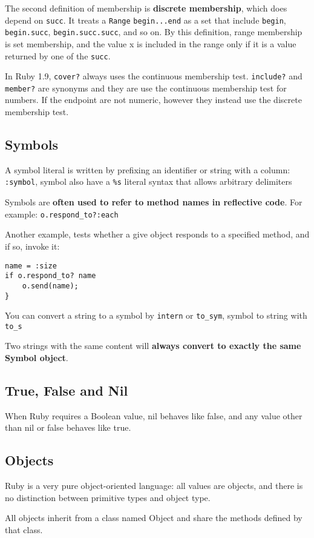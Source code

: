 \documentclass[11pt, a4paper]{book}
\begin{document}
The second definition of membership is \textbf{discrete membership}, which does
depend on \verb|succ|. It treats a \verb|Range| \verb|begin...end| as a set that
include \verb|begin|, \verb|begin.succ|, \verb|begin.succ.succ|, and so on. By
this definition, range membership is set membership, and the value x is included
in the range only if it is a value returned by one of the \verb|succ|.

In Ruby 1.9, \verb|cover?| always uses the continuous membership test.
\verb|include?| and  \verb|member?| are  synonyms and they are use the
continuous membership test for numbers. If the endpoint are not numeric, however they
instead use the discrete membership test.

\subsection{Symbols}
A symbol literal is written by prefixing an identifier or string with a column:
\verb|:symbol|, symbol also have a \verb|%s| literal syntax that allows
arbitrary delimiters

Symbols are \textbf{often used to refer to method names in reflective code}. For
example: \verb|o.respond_to?:each|

Another example, tests whether a give object responds to a specified method, and
if so, invoke it:
\begin{verbatim}
name = :size
if o.respond_to? name
    o.send(name);
}
\end{verbatim}
You can convert a string to a symbol by \verb|intern| or \verb|to_sym|, symbol
to string with \verb|to_s|

Two strings with the same content will \textbf{always convert to exactly the
same Symbol object}.

\subsection{True, False and Nil}
When Ruby requires a Boolean value, nil behaves like false, and any value other
than nil or false behaves like true.

\subsection{Objects}
Ruby is a very pure object-oriented language: all values are objects, and there
is no distinction between primitive types and object type.

All objects inherit from a class named Object and share the methods defined by
that class.
\end{document}
